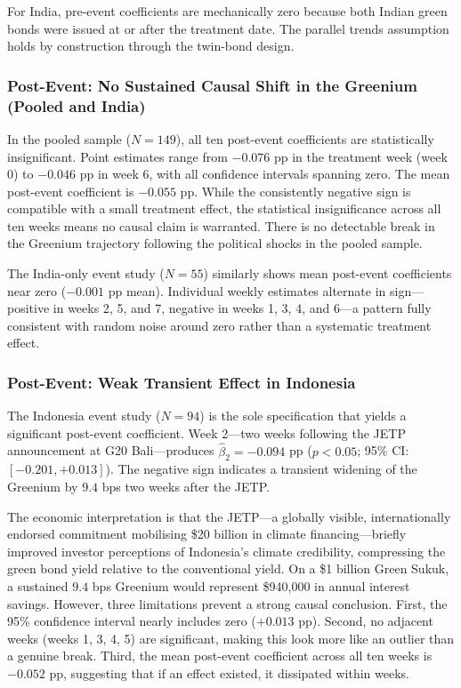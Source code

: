 \documentclass[12pt,a4paper]{article}
\begin{document}
For India, pre-event coefficients are mechanically zero because both Indian green bonds were issued at or after the treatment date. The parallel trends assumption holds by construction through the twin-bond design.

\subsubsection{Post-Event: No Sustained Causal Shift in the Greenium (Pooled and India)}

In the pooled sample ($N = 149$), all ten post-event coefficients are statistically insignificant. Point estimates range from $-0.076$ pp in the treatment week (week 0) to $-0.046$ pp in week 6, with all confidence intervals spanning zero. The mean post-event coefficient is $-0.055$ pp. While the consistently negative sign is compatible with a small treatment effect, the statistical insignificance across all ten weeks means no causal claim is warranted. There is no detectable break in the Greenium trajectory following the political shocks in the pooled sample.

The India-only event study ($N = 55$) similarly shows mean post-event coefficients near zero ($-0.001$ pp mean). Individual weekly estimates alternate in sign---positive in weeks 2, 5, and 7, negative in weeks 1, 3, 4, and 6---a pattern fully consistent with random noise around zero rather than a systematic treatment effect.

\subsubsection{Post-Event: Weak Transient Effect in Indonesia}

The Indonesia event study ($N = 94$) is the sole specification that yields a significant post-event coefficient. Week 2---two weeks following the JETP announcement at G20 Bali---produces $\hat{\beta}_2 = -0.094$ pp ($p < 0.05$; 95\% CI: $[-0.201, +0.013]$). The negative sign indicates a transient widening of the Greenium by $9.4$ bps two weeks after the JETP.

The economic interpretation is that the JETP---a globally visible, internationally endorsed commitment mobilising \$20 billion in climate financing---briefly improved investor perceptions of Indonesia's climate credibility, compressing the green bond yield relative to the conventional yield. On a \$1 billion Green Sukuk, a sustained $9.4$ bps Greenium would represent \$940,000 in annual interest savings. However, three limitations prevent a strong causal conclusion. First, the 95\% confidence interval nearly includes zero ($+0.013$ pp). Second, no adjacent weeks (weeks 1, 3, 4, 5) are significant, making this look more like an outlier than a genuine break. Third, the mean post-event coefficient across all ten weeks is $-0.052$ pp, suggesting that if an effect existed, it dissipated within weeks.
\end{document}

